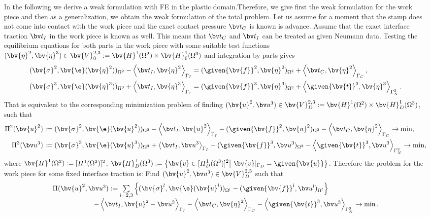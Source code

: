 In the following we derive a weak formulation with FE in the plastic domain.Therefore, we give first the weak formulation for the work piece and then as a generalization, we obtain the weak formulation of the total problem.
Let us assume for a moment that the stamp does not come into contact with the work piece and the exact contact pressure $\bv t_C$ is known is advance. Assume that the exact interface traction $\bv t_I$ in the work piece is known as well. This means that $\bv t_C$ and $\bv t_I$ can be treated as given Neumann data. Testing the equilibrium equations for both parts in the work piece with some suitable test functions 
$(\bv{\eta}^2, \bv{\eta}^3) \in \bv{V}^{2,3}_0 := \bv{H}^1(\Omega^2) \times \bv{H}^1_0(\Omega^3)$ and integration by parts gives
\begin{align*} 
(\bv{\sigma}^2, \bv{\e}(\bv{\eta}^2))_{\Omega^2}
- \left\langle \bv t_I, \bv{\eta}^2 \right\rangle_{\Gamma_I} 
&= (\given{\bv{f}}^{2}, \bv{\eta}^2)_{\Omega^2}
+ \left\langle \bv t_C, \bv{\eta}^2 \right\rangle_{\Gamma_C}, \\
(\bv{\sigma}^3,\bv{\e}(\bv{\eta}^3))_{\Omega^3}
+ \left\langle \bv t_I, \bv{\eta}^3 \right\rangle_{\Gamma_I} 
&= (\given{\bv{f}}^{3}, \bv{\eta}^3)_{\Omega^3}
+ \left\langle \given{\bv{t}}^3, \bv{\eta}^3 \right\rangle_{\Gamma_N^3}.
\end{align*}
That is equivalent to the corresponding minimization problem of finding $(\bv{u}^2,\bv u^3) \in \bv{V}^{2,3}_D := \bv{H}^1(\Omega^2) \times \bv{H}^1_D(\Omega^3)$, such that
\begin{align*} 
\Pi^2 (\bv{u}^2) &:= (\bv{\sigma}^2,\bv{\e}(\bv{u}^2))_{\Omega^2}
- \left\langle \bv t_I, \bv{u}^2 \right\rangle_{\Gamma_I} 
- (\given{\bv{f}}^{2}, \bv{u}^2)_{\Omega^2}
- \left\langle \bv t_C, \bv{\eta}^2 \right\rangle_{\Gamma_C}
 \rightarrow \min, \\
\Pi^3 (\bv u^3) &:= (\bv{\sigma}^3,\bv{\e}(\bv{u}^3))_{\Omega^3}
+ \left\langle \bv t_I, \bv u^3 \right\rangle_{\Gamma_I} 
- (\given{\bv{f}}^{3}, \bv u^3)_{\Omega^3}
- \left\langle \given{\bv{t}}^3, \bv u^3 \right\rangle_{\Gamma_N^3} \rightarrow \min,
\end{align*}
where $\bv{H}^1(\Omega^2):=[H^1(\Omega^2)]^2$, $\displaystyle\bv{H}^1_D(\Omega^3):=\left\lbrace  \bv{v}\in [H^1_D(\Omega^3)]^2\middle|~ \bv{v}|_{\Gamma_D}=\given{\bv{u}}\right\rbrace $. 
Therefore the problem for the work piece for some fixed interface traction is: Find $(\bv{u}^2,\bv u^3) \in \bv{V}^{2,3}_D$ such that
\begin{equation*} 
\begin{array}{l}
\Pi (\bv{u}^2, \bv u^3) := \sum \limits_{l=2,3} \left\lbrace 
   (\bv{\sigma}^l,\bv{\e}(\bv{u}^l))_{\Omega^l}
 - (\given{\bv{f}}^{l}, \bv u^l)_{\Omega^l} \right\rbrace \\
\qquad \qquad \qquad
  - \left\langle \bv t_I, \bv{u}^2 - \bv u^3 \right\rangle_{\Gamma_I} 
 - \left\langle \bv t_C, \bv{\eta}^2 \right\rangle_{\Gamma_C}
 - \left\langle \given{\bv{t}}^3, \bv u^3 \right\rangle_{\Gamma_N^3} \rightarrow \min. 
\end{array}
\end{equation*}
